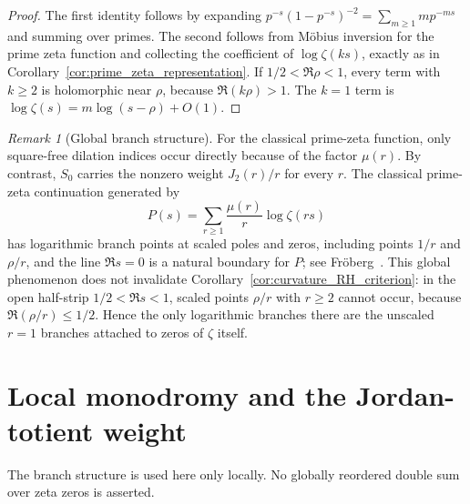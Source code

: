 \documentclass[11pt]{amsart}
\numberwithin{equation}{section}
\theoremstyle{plain}
\theoremstyle{definition}
\theoremstyle{remark}
\newtheorem{remark}[theorem]{Remark}
\begin{document}
\begin{proof}
The first identity follows by expanding
\(p^{-s}(1-p^{-s})^{-2}=\sum_{m\ge1}m p^{-ms}\) and summing over primes.
The second follows from M\"obius inversion for the prime zeta function and
collecting the coefficient of \(\log\zeta(ks)\), exactly as in
Corollary~\ref{cor:prime_zeta_representation}.  If
\(1/2<\Re\rho<1\), every term with \(k\ge2\) is holomorphic near \(\rho\),
because \(\Re(k\rho)>1\).  The \(k=1\) term is
\(\log\zeta(s)=m\log(s-\rho)+O(1)\).
\end{proof}

\begin{remark}[Global branch structure]
\label{rem:global_branch_structure}
For the classical prime-zeta function, only square-free dilation indices occur directly because of the factor \(\mu(r)\).  By contrast, \(S_0\) carries the nonzero weight \(J_2(r)/r\) for every \(r\).  The classical prime-zeta continuation generated by
\begin{equation}
P(s)=\sum_{r\ge1}\frac{\mu(r)}r\log\zeta(rs)
\label{eq:prime_zeta_global_branches}
\end{equation}
has logarithmic branch points at scaled poles and zeros, including points
\(1/r\) and \(\rho/r\), and the line \(\Re s=0\) is a natural boundary for
\(P\); see Fr\"oberg~\cite{Froberg1968}.  This global phenomenon does not
invalidate Corollary~\ref{cor:curvature_RH_criterion}: in the open half-strip
\(1/2<\Re s<1\), scaled points \(\rho/r\) with \(r\ge2\) cannot occur,
because \(\Re(\rho/r)\le1/2\).  Hence the only logarithmic branches there
are the unscaled \(r=1\) branches attached to zeros of \(\zeta\) itself.
\end{remark}

\section{Local monodromy and the Jordan-totient weight}
\label{sec:local_monodromy}

The branch structure is used here only locally.  No globally reordered double
sum over zeta zeros is asserted.
\end{document}
